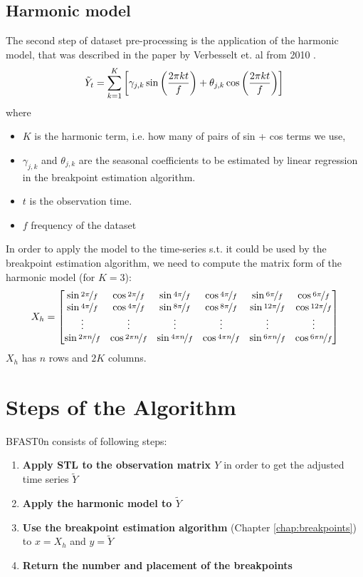 \documentclass[main.tex]{subfiles}
\begin{document}
\subsection{Harmonic model}
\label{subsec:harmonic_model}
The second step of dataset pre-processing is the application of the harmonic
model, that was described in the paper by Verbesselt et. al from 2010 \cite{bfast1}.
\[
\tilde{Y}_t =
\sum_{k=1}^{K}\left[\gamma_{j, k} \sin \left(\frac{2 \pi k t}{f}\right)+
  \theta_{j, k} \cos \left(\frac{2 \pi k t}{f}\right)\right]\\
\]
where
\begin{itemize}
\item $K$ is the harmonic term, i.e. how many of pairs of sin + cos terms we use,
\item $\gamma_{j, k}$ and $\theta_{j, k}$ are the seasonal coefficients to be
  estimated by linear regression in the breakpoint estimation algorithm.
\item $t$ is the observation time.
\item $f$ frequency of the dataset
\end{itemize}
In order to apply the model to the time-series s.t. it could be used by the
breakpoint estimation algorithm, we need to compute the matrix form of the
harmonic model (for $K=3$):
\[
X_{h} =
\begin{bmatrix}
  \sin\nicefrac{2 \pi}{f} & \cos\nicefrac{2 \pi}{f} & \sin\nicefrac{4 \pi}{f} & \cos\nicefrac{4
    \pi}{f} &  \sin\nicefrac{6 \pi}{f} & \cos\nicefrac{6 \pi}{f} \\
  \sin\nicefrac{4 \pi}{f} & \cos\nicefrac{4 \pi}{f} & \sin\nicefrac{8 \pi}{f} & \cos\nicefrac{8
    \pi}{f} &  \sin\nicefrac{12 \pi}{f} & \cos\nicefrac{12 \pi}{f} \\
  \vdots & \vdots  & \vdots & \vdots & \vdots & \vdots \\
  \sin\nicefrac{2 \pi n}{f} & \cos\nicefrac{2 \pi n}{f} & \sin\nicefrac{4 \pi n}{f} &
  \cos\nicefrac{4 \pi n}{f} &  \sin\nicefrac{6 \pi n}{f} & \cos\nicefrac{6 \pi n}{f}
\end{bmatrix}
\]
$X_h$ has $n$ rows and $2K$ columns.

\section{Steps of the Algorithm}
\label{sec:bfast0n_algorithm_steps}
BFAST0n consists of following steps:
\begin{enumerate}
\item \textbf{Apply STL to the observation matrix $Y$} in order to get the adjusted
  time series $\tilde{Y}$
\item \textbf{Apply the harmonic model to $\tilde{Y}$}
\item \textbf{Use the breakpoint estimation algorithm} (Chapter \ref{chap:breakpoints})
  to $x=X_h$ and $y=\tilde{Y}$
\item \textbf{Return the number and placement of the breakpoints}
\end{enumerate}
\end{document}
